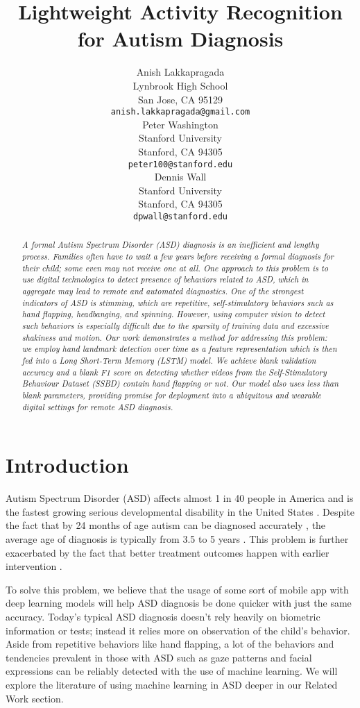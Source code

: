 \documentclass{article}
\title{Lightweight Activity Recognition for Autism Diagnosis}
\author{Anish Lakkapragada \\
	Lynbrook High School\\
	San Jose, CA 95129 \\
	\texttt{anish.lakkapragada@gmail.com} \\
	\And
	Peter Washington \\
	Stanford University \\ 
	Stanford, CA 94305 \\
	\texttt{peter100@stanford.edu} \\
	
	\And
	Dennis Wall \\
	Stanford University \\ 
	Stanford, CA 94305 \\
	\texttt{dpwall@stanford.edu} \\
}
\begin{document}
\maketitle

\begin{abstract}
	\emph{A formal Autism Spectrum Disorder (ASD) diagnosis is an inefficient and lengthy process. Families often have to wait a few years before receiving a formal diagnosis for their child; some even may not receive one at all. One approach to this problem is to use digital technologies to detect presence of behaviors related to ASD, which in aggregate may lead to remote and automated diagnostics. One of the strongest indicators of ASD is stimming, which are repetitive, self-stimulatory behaviors such as hand flapping, headbanging, and spinning. However, using computer vision to detect such behaviors is especially difficult due to the sparsity of training data and excessive shakiness and motion. Our work demonstrates a method for addressing this problem: we employ hand landmark detection over time as a feature representation which is then fed into a Long Short-Term Memory (LSTM) model. We achieve blank validation accuracy and a blank F1 score on detecting whether videos from the Self-Stimulatory Behaviour Dataset (SSBD) contain hand flapping or not. Our model also uses less than blank parameters, providing promise for deployment into a ubiquitous and wearable digital settings for remote ASD diagnosis. }
\end{abstract}


\section{Introduction}

Autism Spectrum Disorder (ASD) affects almost 1 in 40 people in America \cite{kogan2018prevalence} and is the fastest growing serious developmental disability in the United States \cite{ardhanareeswaran2015introduction, gordon2016whittling}. Despite the fact that by 24 months of age autism can be diagnosed accurately \cite{lord2006autism, sacrey2015early}, the average age of diagnosis is typically from 3.5 to 5 years \cite{committee2013pediatrician}. This problem is further exacerbated by the fact that better treatment outcomes happen with earlier intervention \cite{estes2015long}. 

To solve this problem, we believe that the usage of some sort of mobile app with deep learning models will help ASD diagnosis be done quicker with just the same accuracy. Today’s typical ASD diagnosis doesn’t rely heavily on biometric information or tests; instead it relies more on observation of the child’s behavior. Aside from repetitive behaviors like hand flapping, a lot of the behaviors and tendencies prevalent in those with ASD such as gaze patterns and facial expressions can be reliably detected with the use of machine learning. We will explore the literature of using machine learning in ASD deeper in our Related Work section. 
\end{document}
